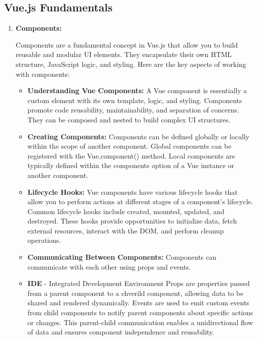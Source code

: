 \subsection{Vue.js Fundamentals}
\begin{enumerate}
\item \textbf{Components:}

Components are a fundamental concept in Vue.js that allow you to build reusable and modular UI elements. They encapsulate their own HTML structure, JavaScript logic, and styling. Here are the key aspects of working with components:
\begin{itemize}
    \item \textbf{Understanding Vue Components:}
        A Vue component is essentially a custom element with its own template, logic, and styling.
        Components promote code reusability, maintainability, and separation of concerns.
        They can be composed and nested to build complex UI structures.

    \item \textbf{Creating Components:}
        Components can be defined globally or locally within the scope of another component.
        Global components can be registered with the Vue.component() method.
        Local components are typically defined within the components option of a Vue instance or another component.

    \item \textbf{Lifecycle Hooks:}
        Vue components have various lifecycle hooks that allow you to perform actions at different stages of a component's lifecycle.
        Common lifecycle hooks include created, mounted, updated, and destroyed.
        These hooks provide opportunities to initialize data, fetch external resources, interact with the DOM, and perform cleanup operations.

    \item \textbf{Communicating Between Components:}
        Components can communicate with each other using props and events.
    \item \textbf{IDE} - Integrated Development Environment
    Props are properties passed from a parent component to a chverild component, allowing data to be shared and rendered dynamically.
        Events are used to emit custom events from child components to notify parent components about specific actions or changes.
        This parent-child communication enables a unidirectional flow of data and ensures component independence and reusability.
\end{itemize}


\end{enumerate}
